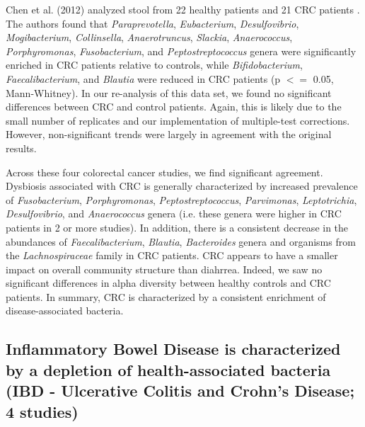 {Chen et al. (2012) analyzed stool from 22 healthy patients and 21 CRC patients \cite{crc-xiang}.
The authors found that \textit{Paraprevotella}, \textit{Eubacterium}, \textit{Desulfovibrio}, \textit{Mogibacterium}, \textit{Collinsella}, \textit{Anaerotruncus}, \textit{Slackia}, \textit{Anaerococcus}, \textit{Porphyromonas}, \textit{Fusobacterium}, and \textit{Peptostreptococcus} genera were significantly enriched in CRC patients relative to controls, while \textit{Bifidobacterium}, \textit{Faecalibacterium}, and \textit{Blautia} were reduced in CRC patients (p $<=$ 0.05, Mann-Whitney).
In our re-analysis of this data set, we found no significant differences between CRC and control patients.
Again, this is likely due to the small number of replicates and our implementation of multiple-test corrections.
However, non-significant trends were largely in agreement with the original results.

Across these four colorectal cancer studies, we find significant agreement.
Dysbiosis associated with CRC is generally characterized by increased prevalence of \textit{Fusobacterium}, \textit{Porphyromonas}, \textit{Peptostreptococcus}, \textit{Parvimonas}, \textit{Leptotrichia}, \textit{Desulfovibrio}, and \textit{Anaerococcus} genera (i.e. these genera were higher in CRC patients in 2 or more studies).
In addition, there is a consistent decrease in the abundances of \textit{Faecalibacterium}, \textit{Blautia}, \textit{Bacteroides} genera and organisms from the \textit{Lachnospiraceae} family in CRC patients.
CRC appears to have a smaller impact on overall community structure than diahrrea.
Indeed, we saw no significant differences in alpha diversity between healthy controls and CRC patients.
In summary, CRC is characterized by a consistent enrichment of disease-associated bacteria.

\subsection*{Inflammatory Bowel Disease is characterized by a depletion of health-associated bacteria (IBD - Ulcerative Colitis and Crohn's Disease; 4 studies)}

}
